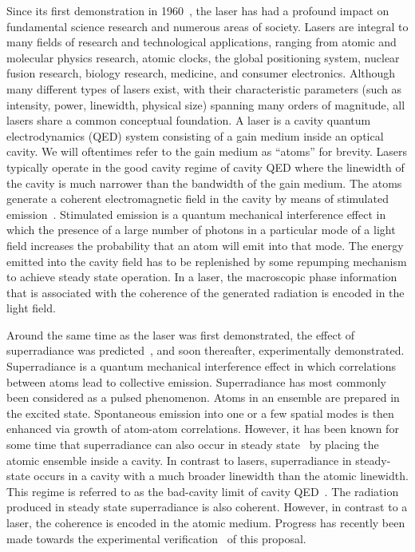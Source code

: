 \documentclass[aps,
twocolumn,
showpacs,
superscriptaddress,groupedaddress]{revtex4}
\begin{document}
Since its first demonstration in 1960~\cite{maiman1960stimulated}, the
laser has had a profound impact on fundamental science research and
numerous areas of society.  Lasers are integral to many fields of
research and technological applications, ranging from atomic and
molecular physics research, atomic clocks, the global positioning
system, nuclear fusion research, biology research, medicine, and
consumer electronics.  Although many different types of lasers exist,
with their characteristic parameters (such as intensity, power,
linewidth, physical size) spanning many orders of magnitude, all lasers
share a common conceptual foundation.  A laser is a cavity quantum
electrodynamics (QED) system consisting of a gain medium inside an
optical cavity.  We will oftentimes refer to the gain medium as
``atoms'' for brevity.  Lasers typically operate in the good cavity
regime of cavity QED where the linewidth of the cavity is much narrower
than the bandwidth of the gain medium.  The atoms generate a coherent
electromagnetic field in the cavity by means of stimulated
emission~\cite{PhysRev.112.1940}.  Stimulated emission is a quantum
mechanical interference effect in which the presence of a large number
of photons in a particular mode of a light field increases the
probability that an atom will emit into that mode. The energy emitted
into the cavity field has to be replenished by some repumping mechanism
to achieve steady state operation. In a laser, the macroscopic phase
information that is associated with the coherence of the generated
radiation is encoded in the light field.

Around the same time as the laser was first demonstrated, the effect
of superradiance was predicted~\cite{PhysRev.93.99}, and soon
thereafter, experimentally demonstrated.  Superradiance is a quantum
mechanical interference effect in which correlations between atoms
lead to collective emission.  Superradiance has most commonly been
considered as a pulsed phenomenon.  Atoms in an ensemble are prepared
in the excited state.  Spontaneous emission into one or a few spatial
modes is then enhanced via growth of atom-atom correlations.
However, it has been known for some time that superradiance can also
occur in steady state~\cite{PhysRevLett.102.163601,
  PhysRevA.81.033847, PhysRevA.81.063827,PhysRevLett.89.253003} by
placing the atomic ensemble inside a cavity.  In contrast to lasers,
superradiance in steady-state occurs in a cavity with a much broader
linewidth than the atomic linewidth.  This regime is referred to as
the bad-cavity limit of cavity QED~\cite{PhysRevA.51.809,
  PhysRevLett.72.3815, ChenDeliciousLaser, HakenLaser,
  HakenLaserBook}.  The radiation produced in steady state
superradiance is also coherent.  However, in contrast to a laser, the
coherence is encoded in the atomic medium.  Progress has recently been
made towards the experimental
verification~\cite{ThompsonPaper,bohnet2012relaxation} of this proposal.
\end{document}
